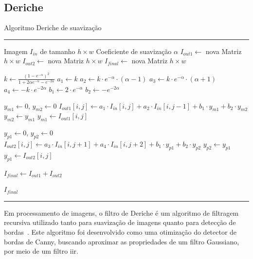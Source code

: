 \subsection{Deriche}\label{subsec:deriche}

\begin{algorithm}[htb]
	\caption{Algoritmo Deriche de suavização}
	\label{alg:deriche1d}
	\hrule
	\begin{algorithmic}[1]
		\REQUIRE Imagem $I_{in}$ de tamanho $h \times w$
		\REQUIRE Coeficiente de suavização $\alpha$
		\STATE $I_{out1} \gets$ nova Matriz $h \times w$
		\STATE $I_{out2} \gets$ nova Matriz $h \times w$
		\STATE $I_{final} \gets$ nova Matriz $h \times w$

		\STATE $k \gets \frac{(1 - e^{-\alpha})^2}{1 + 2\alpha e^{-\alpha} - e^{-2\alpha}}$
		\STATE $a_1 \gets k$
		\STATE $a_2 \gets k \cdot e^{-\alpha} \cdot (\alpha - 1)$
		\STATE $a_3 \gets k \cdot e^{-\alpha} \cdot (\alpha + 1)$
		\STATE $a_4 \gets -k \cdot e^{-2\alpha}$
		\STATE $b_1 \gets 2 \cdot e^{-\alpha}$
		\STATE $b_2 \gets -e^{-2\alpha}$

		\STATE $y_{m1} \gets 0$, $y_{m2} \gets 0$
		\STATE $I_{out1}[i, j] \gets a_1 \cdot I_{in}[i, j] + a_2 \cdot I_{in}[i, j-1] + b_1 \cdot y_{m1} + b_2 \cdot y_{m2}$
		\STATE $y_{m2} \gets y_{m1}$
		\STATE $y_{m1} \gets I_{out1}[i, j]$
		\ENDFOR
		\ENDFOR

		\STATE $y_{p1} \gets 0$, $y_{p2} \gets 0$
		\STATE $I_{out2}[i, j] \gets a_3 \cdot I_{in}[i, j+1] + a_4 \cdot I_{in}[i, j+2] + b_1 \cdot y_{p1} + b_2 \cdot y_{p2}$
		\STATE $y_{p2} \gets y_{p1}$
		\STATE $y_{p1} \gets I_{out2}[i, j]$
		\ENDFOR
		\ENDFOR

		\STATE $I_{final} \gets I_{out1} + I_{out2}$

		\RETURN $I_{final}$
	\end{algorithmic}
	\hrule
\end{algorithm}

Em processamento de imagens, o filtro de Deriche é um algoritmo de filtragem recursiva utilizado tanto para suavização de imagens quanto para detecção de bordas~\cite{deriche1987}. Este algoritmo foi desenvolvido como uma otimização do detector de bordas de Canny, buscando aproximar as propriedades de um filtro Gaussiano, por meio de um filtro \gls{iir}.

